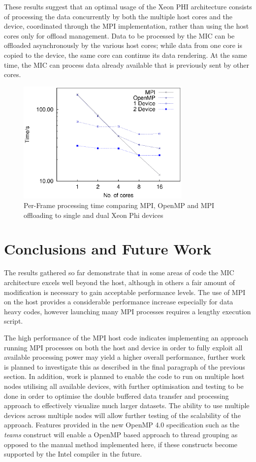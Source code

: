\documentclass[runningheads,a4paper]{llncs}
\begin{document}
These results suggest that an optimal usage of the Xeon PHI architecture consists of processing the data concurrently by both 
the multiple host cores and the device, coordinated through the MPI implementation, rather than using the host cores only for offload 
management.
Data to be processed by the MIC can be offloaded asynchronously by the various host cores; while data from one core is copied to 
the device, the same core can continue its data rendering. At the same time, the MIC can process data already available that is 
previously sent by other cores.

\begin{figure}
\centering
\includegraphics[height=6.0cm]{mpi_omp_mic}
\caption{Per-Frame processing time comparing MPI, OpenMP and MPI offloading to single and dual Xeon Phi devices}
\label{fig:mpitimes}
\end{figure}



\section{Conclusions and Future Work}
\label{sect:conclusions}

The results gathered so far demonstrate that in some areas of code the MIC architecture excels well beyond the host, 
although in others a fair amount of modification is necessary to gain acceptable performance levels. The use of MPI on the host
provides a considerable performance increase especially for data heavy codes, however launching many MPI processes requires a lengthy 
execution script.

The high performance of the MPI host code indicates implementing an approach running MPI processes on both the host and device 
in order to fully exploit all available processing power may yield a higher overall performance, further work is planned to investigate this 
as described in the final paragraph of the previous section.
In addition, work is planned to enable the code to run on multiple host nodes utilising all available devices, with further optimisation and 
testing to be done in order to optimise the double buffered data transfer and processing approach to effectively visualize much larger 
datasets. The ability to use multiple devices across multiple nodes will allow further testing of the scalability of the approach. 
Features provided in the new OpenMP 4.0 specification such as the \textit{teams} construct will enable a OpenMP based approach to 
thread grouping as opposed to the manual method implemented here, if these constructs become supported by the Intel compiler in the future. 
\end{document}
